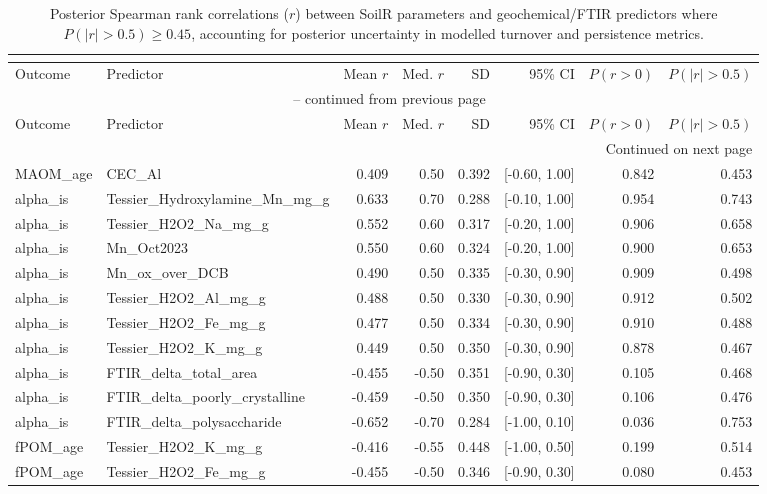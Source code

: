 \documentclass[preprint,12pt]{elsarticle}
\begin{document}
\begin{landscape}
\begin{longtable}{llrrrrrr}
\caption{Posterior Spearman rank correlations ($r$) between SoilR parameters and geochemical/FTIR predictors where $P(\vert{}r\vert{} > 0.5) \ge 0.45$, accounting for posterior uncertainty in modelled turnover and persistence metrics.}\\
\label{tab:soilr_corr_sub}\\
\toprule
Outcome & Predictor & Mean $r$ & Med. $r$ & SD & 95\% CI & $P(r>0)$ & $P(|r|>0.5)$ \\
\midrule
\endfirsthead
\multicolumn{8}{c}{{\tablename\ \thetable{} -- continued from previous page}} \\
\toprule
Outcome & Predictor & Mean $r$ & Med. $r$ & SD & 95\% CI & $P(r>0)$ & $P(|r|>0.5)$ \\
\midrule
\endhead
\midrule \multicolumn{8}{r}{{Continued on next page}} \\ \endfoot
\bottomrule \endlastfoot
MAOM\_age & CEC\_Al & 0.409 & 0.50 & 0.392 & [-0.60, 1.00] & 0.842 & 0.453 \\
alpha\_is & Tessier\_Hydroxylamine\_Mn\_mg\_g & 0.633 & 0.70 & 0.288 & [-0.10, 1.00] & 0.954 & 0.743 \\
alpha\_is & Tessier\_H2O2\_Na\_mg\_g & 0.552 & 0.60 & 0.317 & [-0.20, 1.00] & 0.906 & 0.658 \\
alpha\_is & Mn\_Oct2023 & 0.550 & 0.60 & 0.324 & [-0.20, 1.00] & 0.900 & 0.653 \\
alpha\_is & Mn\_ox\_over\_DCB & 0.490 & 0.50 & 0.335 & [-0.30, 0.90] & 0.909 & 0.498 \\
alpha\_is & Tessier\_H2O2\_Al\_mg\_g & 0.488 & 0.50 & 0.330 & [-0.30, 0.90] & 0.912 & 0.502 \\
alpha\_is & Tessier\_H2O2\_Fe\_mg\_g & 0.477 & 0.50 & 0.334 & [-0.30, 0.90] & 0.910 & 0.488 \\
alpha\_is & Tessier\_H2O2\_K\_mg\_g & 0.449 & 0.50 & 0.350 & [-0.30, 0.90] & 0.878 & 0.467 \\
alpha\_is & FTIR\_delta\_total\_area & -0.455 & -0.50 & 0.351 & [-0.90, 0.30] & 0.105 & 0.468 \\
alpha\_is & FTIR\_delta\_poorly\_crystalline & -0.459 & -0.50 & 0.350 & [-0.90, 0.30] & 0.106 & 0.476 \\
alpha\_is & FTIR\_delta\_polysaccharide & -0.652 & -0.70 & 0.284 & [-1.00, 0.10] & 0.036 & 0.753 \\
fPOM\_age & Tessier\_H2O2\_K\_mg\_g & -0.416 & -0.55 & 0.448 & [-1.00, 0.50] & 0.199 & 0.514 \\
fPOM\_age & Tessier\_H2O2\_Fe\_mg\_g & -0.455 & -0.50 & 0.346 & [-0.90, 0.30] & 0.080 & 0.453 \\

\end{longtable}
\end{landscape}
\end{document}

